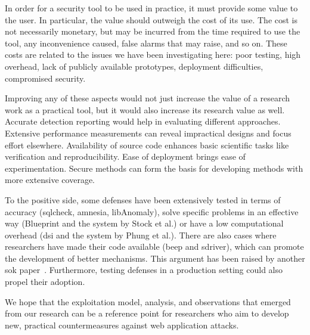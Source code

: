 \documentclass[conference]{IEEEtran}
\begin{document}
In order for a security tool to be used in practice, it must provide
some value to the user. In particular, the value should outweigh the
cost of its use. The cost is not necessarily monetary, but may be
incurred from the time required to use the tool, any inconvenience
caused, false alarms that may raise, and so on. These costs are related to the
issues we have been investigating here: poor testing, high overhead,
lack of publicly available prototypes,
deployment difficulties, compromised security. 

Improving any of these aspects would not just increase the value of a 
research work as a practical tool, but it would also increase its
research value as well.
Accurate detection reporting would help in evaluating different
approaches. Extensive performance measurements can reveal impractical
designs and focus effort elsewhere. Availability of source code
enhances basic scientific tasks like verification and reproducibility. Ease of
deployment brings ease of experimentation. Secure methods can form the
basis for developing methods with more extensive coverage.

To the positive side, some defenses have been extensively tested in
terms of accuracy ({\sc sqlc}heck, {\sc amnesia},
libAnomaly), solve specific problems in an effective way (Blueprint
and the system by Stock et al.) or have a low computational overhead
({\sc dsi} and the system by Phung et al.). There are also cases where
researchers have made their code available ({\sc beep} and {\sc
  sd}river), which can promote the development of better
mechanisms. This argument has been raised by another {\sc s}o{\sc k}
paper~\cite{SPWS13}. Furthermore, testing defenses in a production
setting could also propel their adoption.

We hope that the exploitation model, analysis, and observations that
emerged from our research can be a reference point for researchers who
aim to develop new, practical countermeasures against web application
attacks.


\end{document}
